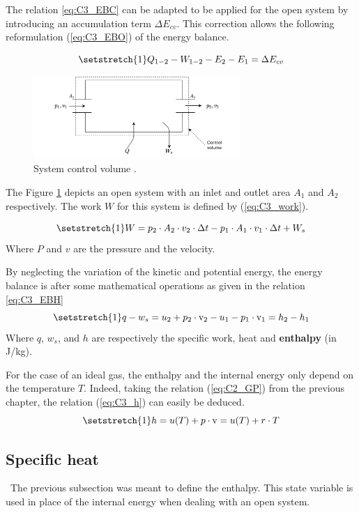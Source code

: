 The relation \ref{eq:C3_EBC} can be adapted to be applied for the open system by introducing an accumulation term $\Delta E_{cv}$. This correction allows the following reformulation (\ref{eq:C3_EBO}) of the energy balance.

\begin{equation}
\setstretch{1}
Q_{1-2} - W_{1-2} - E_{2} - E_{1} = \Delta E_{cv}\label{eq:C3_EBO}
\end{equation}
\begin{figure}[h]
\centering
\includegraphics[width=0.7\textwidth]{control_volume.png}
\caption{System control volume \cite{Dewallef2019}.}
\label{fig:C3_VC}
\end{figure}
The Figure \ref{fig:C3_VC} depicts an open system with an inlet and outlet area $A_1$ and $A_2$ respectively. The work $W$ for this system is defined by (\ref{eq:C3_work}).

\begin{equation}
\setstretch{1}
W = p_2\cdot A_2\cdot v_2\cdot \Delta t - p_1\cdot A_1\cdot v_1\cdot \Delta t + W_s \label{eq:C3_work}
\end{equation}      
Where $P$ and $v$ are the pressure and the velocity.

By neglecting the variation of the kinetic and potential energy, the energy balance is after some mathematical operations as given in the relation \ref{eq:C3_EBH}
\begin{equation}
\setstretch{1}
q - w_s = u_2 +p_2\cdot \mathrm{v}_2 - u_1 - p_1\cdot \mathrm{v}_1 = h_2 - h_1\label{eq:C3_EBH}
\end{equation}
Where $q$, $w_s$, and $h$ are respectively the specific work, heat and \textbf{enthalpy} (in J/kg).  

For the case of an ideal gas, the enthalpy and the internal energy only depend on the temperature $T$. Indeed, taking the relation (\ref{eq:C2_GP}) from the previous chapter, the relation (\ref{eq:C3_h}) can easily be deduced.
\begin{equation}
\setstretch{1}
h = u(T) + p\cdot \mathrm{v} = u(T) + r\cdot T \label{eq:C3_h}
\end{equation}
\subsection{Specific heat}
\quad\ The previous subsection was meant to define the enthalpy. This state variable is used in place of the internal energy when dealing with an open system.

